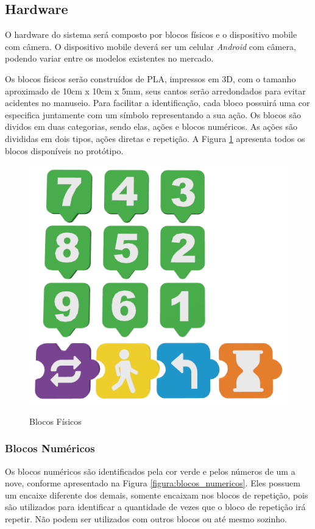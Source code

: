     \subsection{Hardware}
    O hardware do sistema será composto por blocos físicos e o dispositivo mobile com câmera. O dispositivo mobile deverá ser um celular \textit{Android} com câmera, podendo variar entre os modelos existentes no mercado.
    
    Os blocos físicos serão construídos de PLA, impressos em 3D, com o tamanho aproximado de 10cm x 10cm x 5mm, seus cantos serão arredondados para evitar acidentes no manuseio. Para facilitar a identificação, cada bloco possuirá uma cor especifica juntamente com um símbolo representando a sua ação.
    Os blocos são dividos em duas categorias, sendo elas, ações e blocos numéricos. As ações são divididas em dois tipos, ações diretas e repetição. A Figura \ref{figura:blocos_fisicos} apresenta todos os blocos disponíveis no protótipo.
    
    \begin{figure}[H]
        \caption{Blocos Físicos}
        \centering
        \includegraphics[width=\linewidth]{Imagens/Cap3/Blocos/Todos.png}
        \label{figura:blocos_fisicos}
    \end{figure}
    
    \subsubsection{Blocos Numéricos}
        Os blocos numéricos são identificados pela cor verde e pelos números de um a nove, conforme apresentado na Figura \ref{figura:blocos_numericos}. Eles possuem um encaixe diferente dos demais, somente encaixam nos blocos de repetição, pois são utilizados para identificar a quantidade de vezes que o bloco de repetição irá repetir. Não podem ser utilizados com outros blocos ou até mesmo sozinho.
        
